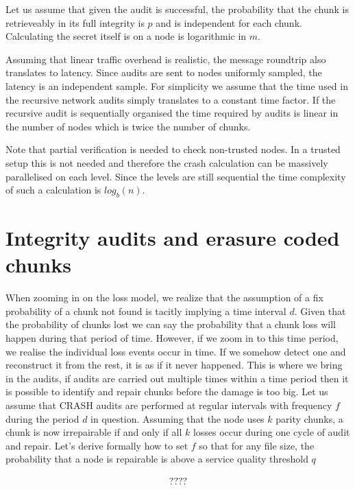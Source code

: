 \documentclass[12pt]{article}
\begin{document}
{Let us assume that given the audit is successful, the probability that the chunk is retrieveably in its full integrity is $p$ and is independent for each chunk.
Calculating the secret itself is on a node is logarithmic in $m$.


Assuming that linear traffic overhead is realistic, the message roundtrip also translates to latency. Since audits are sent to nodes uniformly sampled, the latency is an independent sample. For simplicity we assume that the time used in the recursive network audits simply translates to a constant time factor. If the recursive audit is sequentially organised the time required by audits is linear in the number of nodes which is twice the number of chunks.

Note that partial verification is needed to check non-trusted nodes. In a trusted setup this is not needed and therefore the crash calculation can be massively parallelised on each level. Since the levels are still sequential the time complexity of such a calculation is $log_{b}(n)$.

\section{Integrity audits and erasure coded chunks}

When zooming in on the loss model, we realize that the assumption of a fix probability of a chunk not found is tacitly implying a time interval $d$. Given that the probability of chunks lost we can say the probability that a chunk loss will happen during that period of time. However, if we zoom in to this time period, we realise the individual loss events occur in time. If we somehow detect one and reconstruct it from the rest, it is as if it never happened. This is where we bring in the audits, if audits are carried out multiple times within a time period then it is possible to identify and repair chunks before the damage is too big.
Let us assume that CRASH audits are performed at regular intervals with frequency $f$ during the period $d$ in question. Assuming that the node uses $k$ parity chunks,  a chunk is now irrepairable if and only if all $k$ losses occur during one cycle of audit and repair. Let's derive formally how to set $f$ so that for any file size, the probability that a node is repairable is above a service quality threshold $q$

\begin{align*}
????
\end{align*}

}
\end{document}
